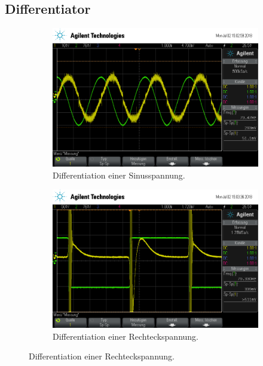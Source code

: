 \subsection{Differentiator}
\begin{figure}[ht]
  \centering
  
  \caption{}
  \label{fig:dif}
\end{figure}
\begin{figure}[ht]
  \centering
  \begin{subfigure}[]{\textwidth}
    \centering
    \includegraphics[height=0.3\textheight]{data/scope_265.png}
    \caption{Differentiation einer Sinusspannung.}
    \label{subfig:dif_sinus}
  \end{subfigure}
  \begin{subfigure}[]{\textwidth}
    \centering
    \includegraphics[height=0.3\textheight]{data/scope_266.png}
    \caption{Differentiation einer Rechteckspannung.}

\end{subfigure}
\end{figure}
